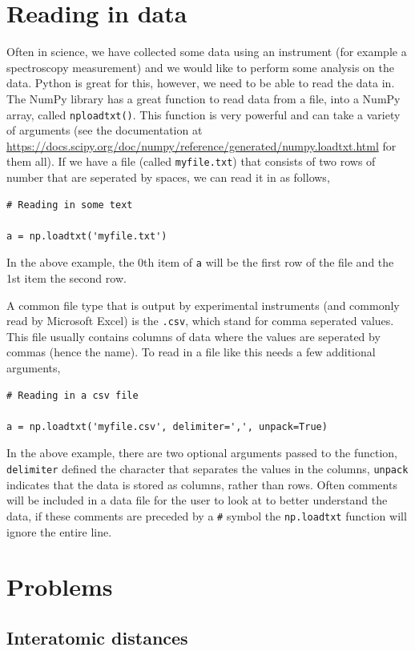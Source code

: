 \documentclass[a4paper]{article}
\begin{document}
\section{Reading in data}

Often in science, we have collected some data using an instrument (for example a spectroscopy measurement) and we would like to perform some analysis on the data.
Python is great for this, however, we need to be able to read the data in.
The NumPy library has a great function to read data from a file, into a NumPy array, called \texttt{nploadtxt()}.
This function is very powerful and can take a variety of arguments (see the documentation at \url{https://docs.scipy.org/doc/numpy/reference/generated/numpy.loadtxt.html} for them all).
If we have a file (called \texttt{myfile.txt}) that consists of two rows of number that are seperated by spaces, we can read it in as follows,
\begin{lstlisting}
# Reading in some text

a = np.loadtxt('myfile.txt')
\end{lstlisting}
In the above example, the 0th item of \texttt{a} will be the first row of the file and the 1st item the second row.

A common file type that is output by experimental instruments (and commonly read by Microsoft Excel) is the \texttt{.csv}, which stand for comma seperated values.
This file usually contains columns of data where the values are seperated by commas (hence the name).
To read in a file like this needs a few additional arguments,
\begin{lstlisting}
# Reading in a csv file

a = np.loadtxt('myfile.csv', delimiter=',', unpack=True)
\end{lstlisting}
In the above example, there are two optional arguments passed to the function, \texttt{delimiter} defined the character that separates the values in the columns, \texttt{unpack} indicates that the data is stored as columns, rather than rows.
Often comments will be included in a data file for the user to look at to better understand the data, if these comments are preceded by a \texttt{\#} symbol the \texttt{np.loadtxt} function will ignore the entire line.

\section{Problems}

\subsection{Interatomic distances}
\end{document}
